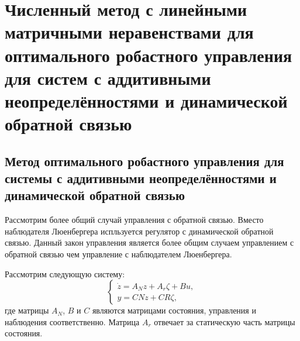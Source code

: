 \chapter{Численный метод с линейными матричными неравенствами для оптимального робастного управления для систем с аддитивными неопределённостями и динамической обратной связью}\label{ch:ch5}
\section{Метод оптимального робастного управления для системы с аддитивными неопределённостями и динамической обратной связью}\label{sec:ch5/sect1}
Рассмотрим более общий случай управления с обратной связью. Вместо наблюдателя Люенбергера испльзуется регулятор с динамической обратной связью. Данный закон управления является более общим случаем управлением с обратной связью чем управление с наблюдателем Люенбергера.

Рассмотрим следующую систему:
\begin{equation}
	\label{eq:part5_linear_dynamics}
	\begin{cases}
		\dot z={A}_N {z} + {A}_r {\zeta} + {B} {u},\\
		y = {C} {N} {z} + {C} {R} {\zeta},
	\end{cases}
\end{equation}
где матрицы $A_N$,  $B$ и $C$ являются матрицами состояния, управления и наблюдения соответственно. Матрица ${A}_r$ отвечает за статическую часть матрицы состояния.

